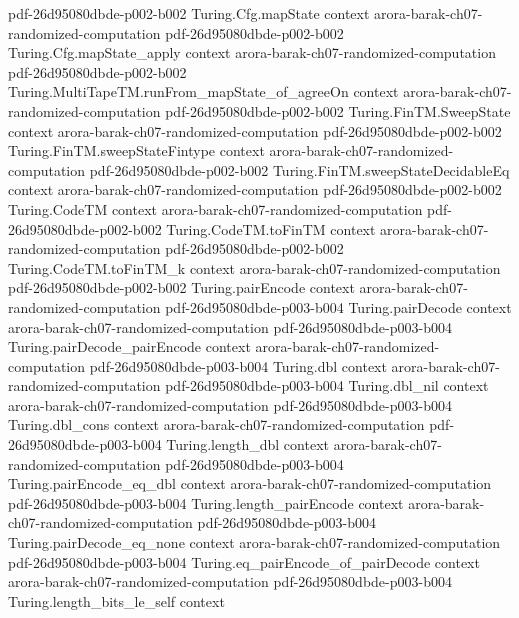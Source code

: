 \begin{theorem}
  {pdf-26d95080dbde-p002-b002}
\proofstep
  {Turing.Cfg.mapState}
  {context}
  {arora-barak-ch07-randomized-computation}
  {pdf-26d95080dbde-p002-b002}
\proofstep
  {Turing.Cfg.mapState_apply}
  {context}
  {arora-barak-ch07-randomized-computation}
  {pdf-26d95080dbde-p002-b002}
\proofstep
  {Turing.MultiTapeTM.runFrom_mapState_of_agreeOn}
  {context}
  {arora-barak-ch07-randomized-computation}
  {pdf-26d95080dbde-p002-b002}
\proofstep
  {Turing.FinTM.SweepState}
  {context}
  {arora-barak-ch07-randomized-computation}
  {pdf-26d95080dbde-p002-b002}
\proofstep
  {Turing.FinTM.sweepStateFintype}
  {context}
  {arora-barak-ch07-randomized-computation}
  {pdf-26d95080dbde-p002-b002}
\proofstep
  {Turing.FinTM.sweepStateDecidableEq}
  {context}
  {arora-barak-ch07-randomized-computation}
  {pdf-26d95080dbde-p002-b002}
\proofstep
  {Turing.CodeTM}
  {context}
  {arora-barak-ch07-randomized-computation}
  {pdf-26d95080dbde-p002-b002}
\proofstep
  {Turing.CodeTM.toFinTM}
  {context}
  {arora-barak-ch07-randomized-computation}
  {pdf-26d95080dbde-p002-b002}
\proofstep
  {Turing.CodeTM.toFinTM_k}
  {context}
  {arora-barak-ch07-randomized-computation}
  {pdf-26d95080dbde-p002-b002}
\proofstep
  {Turing.pairEncode}
  {context}
  {arora-barak-ch07-randomized-computation}
  {pdf-26d95080dbde-p003-b004}
\proofstep
  {Turing.pairDecode}
  {context}
  {arora-barak-ch07-randomized-computation}
  {pdf-26d95080dbde-p003-b004}
\proofstep
  {Turing.pairDecode_pairEncode}
  {context}
  {arora-barak-ch07-randomized-computation}
  {pdf-26d95080dbde-p003-b004}
\proofstep
  {Turing.dbl}
  {context}
  {arora-barak-ch07-randomized-computation}
  {pdf-26d95080dbde-p003-b004}
\proofstep
  {Turing.dbl_nil}
  {context}
  {arora-barak-ch07-randomized-computation}
  {pdf-26d95080dbde-p003-b004}
\proofstep
  {Turing.dbl_cons}
  {context}
  {arora-barak-ch07-randomized-computation}
  {pdf-26d95080dbde-p003-b004}
\proofstep
  {Turing.length_dbl}
  {context}
  {arora-barak-ch07-randomized-computation}
  {pdf-26d95080dbde-p003-b004}
\proofstep
  {Turing.pairEncode_eq_dbl}
  {context}
  {arora-barak-ch07-randomized-computation}
  {pdf-26d95080dbde-p003-b004}
\proofstep
  {Turing.length_pairEncode}
  {context}
  {arora-barak-ch07-randomized-computation}
  {pdf-26d95080dbde-p003-b004}
\proofstep
  {Turing.pairDecode_eq_none}
  {context}
  {arora-barak-ch07-randomized-computation}
  {pdf-26d95080dbde-p003-b004}
\proofstep
  {Turing.eq_pairEncode_of_pairDecode}
  {context}
  {arora-barak-ch07-randomized-computation}
  {pdf-26d95080dbde-p003-b004}
\proofstep
  {Turing.length_bits_le_self}
  {context}

\end{theorem}
